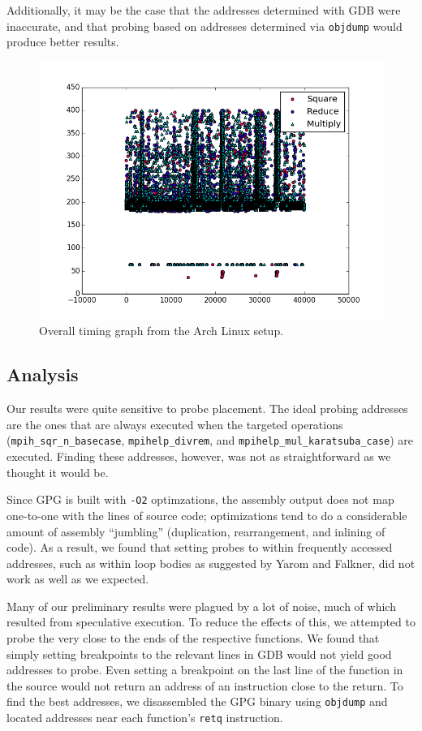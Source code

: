 \documentclass[11pt]{llncs}
\begin{document}
Additionally, it may be the case that the addresses determined with GDB were
inaccurate, and that probing based on addresses determined via \texttt{objdump}
would produce better results.

\begin{figure}[h]
  \centering
    \includegraphics[width=\linewidth]{img/data/arch-graph-1}
  \caption{Overall timing graph from the Arch Linux setup.}
  \label{fig:data-arch}
\end{figure}

\subsection{Analysis}

Our results were quite sensitive to probe placement. The ideal probing addresses
are the ones that are always executed when the targeted operations
(\texttt{mpih\_sqr\_n\_basecase}, \texttt{mpihelp\_divrem}, and
\texttt{mpihelp\_mul\_karatsuba\_case}) are executed. Finding these addresses,
however, was not as straightforward as we thought it would be.

Since GPG is built with \texttt{-O2} optimzations, the assembly output does not
map one-to-one with the lines of source code; optimizations tend to do a
considerable amount of assembly ``jumbling'' (duplication, rearrangement, and
inlining of code). As a result, we found that setting probes to within
frequently accessed addresses, such as within loop bodies as suggested by Yarom
and Falkner\cite{YF13}, did not work as well as we expected.

Many of our preliminary results were plagued by a lot of noise, much of which
resulted from speculative execution. To reduce the effects of this, we attempted
to probe the very close to the ends of the respective functions. We found that
simply setting breakpoints to the relevant lines in GDB would not yield good
addresses to probe. Even setting a breakpoint on the last line of the function
in the source would not return an address of an instruction close to the return.
To find the best addresses, we disassembled the GPG binary using
\texttt{objdump} and located addresses near each function's \texttt{retq}
instruction.
\end{document}
